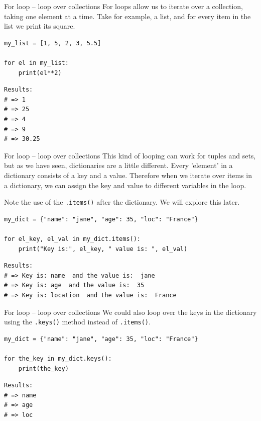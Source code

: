 \documentclass[10pt]{beamer}
\begin{document}
\begin{frame}[label={sec:org9d83a23},fragile]{For loop -- loop over collections}
 For loops allow us to iterate over a collection, taking one element at a time. Take
for example, a list, and for every item in the list we print its square.

\begin{verbatim}
my_list = [1, 5, 2, 3, 5.5]

for el in my_list:
    print(el**2)
\end{verbatim}

\begin{verbatim}
Results: 
# => 1
# => 25
# => 4
# => 9
# => 30.25
\end{verbatim}
\end{frame}

\begin{frame}[label={sec:orgd6cf556},fragile]{For loop -- loop over collections}
 This kind of looping can work for tuples and sets, but as we have seen, dictionaries
are a little different. Every 'element' in a dictionary consists of a key and a
value. Therefore when we iterate over items in a dictionary, we can assign the key
and value to different variables in the loop.

\alert{Note} the use of the \texttt{.items()} after the dictionary. We will explore this later.

\begin{verbatim}
my_dict = {"name": "jane", "age": 35, "loc": "France"}

for el_key, el_val in my_dict.items():
    print("Key is:", el_key, " value is: ", el_val)
\end{verbatim}

\begin{verbatim}
Results: 
# => Key is: name  and the value is:  jane
# => Key is: age  and the value is:  35
# => Key is: location  and the value is:  France
\end{verbatim}
\end{frame}


\begin{frame}[label={sec:org1bdc185},fragile]{For loop -- loop over collections}
 We could also loop over the keys in the dictionary using the \texttt{.keys()} method instead
of \texttt{.items()}.

\begin{verbatim}
my_dict = {"name": "jane", "age": 35, "loc": "France"}

for the_key in my_dict.keys():
    print(the_key)
\end{verbatim}

\begin{verbatim}
Results: 
# => name
# => age
# => loc
\end{verbatim}
\end{frame}
\end{document}
